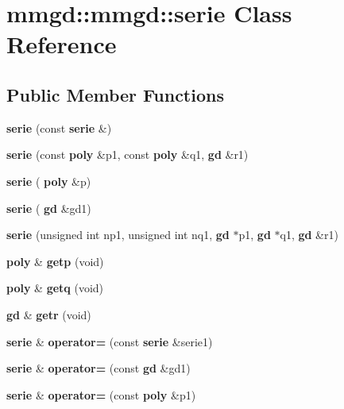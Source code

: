 \section{mmgd\+:\+:mmgd\+:\+:serie Class Reference}
\label{classmmgd_1_1mmgd_1_1serie}
\subsection*{Public Member Functions}
\begin{DoxyCompactItemize}
\item 
\mbox{\label{classmmgd_1_1mmgd_1_1serie_aaa97a51daa7e06a231be806a84bd6073}} 
{\bfseries serie} (const \textbf{ serie} \&)
\item 
\mbox{\label{classmmgd_1_1mmgd_1_1serie_a2e5e176ba9944ac572e1999018e44886}} 
{\bfseries serie} (const \textbf{ poly} \&p1, const \textbf{ poly} \&q1, \textbf{ gd} \&r1)
\item 
\mbox{\label{classmmgd_1_1mmgd_1_1serie_a4725a58c8ea4de37d2cdd88dd5b4c914}} 
{\bfseries serie} (\textbf{ poly} \&p)
\item 
\mbox{\label{classmmgd_1_1mmgd_1_1serie_a33e8a0a46077473352724801e10b3cf6}} 
{\bfseries serie} (\textbf{ gd} \&gd1)
\item 
\mbox{\label{classmmgd_1_1mmgd_1_1serie_af3813bfd7099de4e1b0493dc310bd3fc}} 
{\bfseries serie} (unsigned int np1, unsigned int nq1, \textbf{ gd} $\ast$p1, \textbf{ gd} $\ast$q1, \textbf{ gd} \&r1)
\item 
\mbox{\label{classmmgd_1_1mmgd_1_1serie_a517a999407ccd4822b9ece14d893eef4}} 
\textbf{ poly} \& {\bfseries getp} (void)
\item 
\mbox{\label{classmmgd_1_1mmgd_1_1serie_a9f982c6937c5f612a99361a7c6e2fb4c}} 
\textbf{ poly} \& {\bfseries getq} (void)
\item 
\mbox{\label{classmmgd_1_1mmgd_1_1serie_a50089f3e9a9953833037564f0db5efaf}} 
\textbf{ gd} \& {\bfseries getr} (void)
\item 
\mbox{\label{classmmgd_1_1mmgd_1_1serie_a066f2b3c24ff28b1b771040c7e01166e}} 
\textbf{ serie} \& {\bfseries operator=} (const \textbf{ serie} \&serie1)
\item 
\mbox{\label{classmmgd_1_1mmgd_1_1serie_a2f14a188cfab4354429d9f0f87a82e58}} 
\textbf{ serie} \& {\bfseries operator=} (const \textbf{ gd} \&gd1)
\item 
\mbox{\label{classmmgd_1_1mmgd_1_1serie_a21cca4fee933ae71f605215b13a612ae}} 
\textbf{ serie} \& {\bfseries operator=} (const \textbf{ poly} \&p1)
\item 

\end{DoxyCompactItemize}
